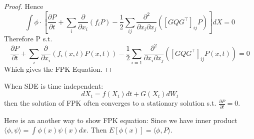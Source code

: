 \begin{proof}
    Hence $$\int \phi \cdot\left[\frac{\partial P}{\partial t}+\sum_{i} \frac{\partial}{\partial x_{i}}\left(f_{i} P\right)-\frac{1}{2} \sum_{i j} \frac{\partial^{2}}{\partial x_{i} \partial x_{j}}\left(\left[G Q G^{\top}\right]_{i j} P\right)\right] d X=0$$
    Therefore P s.t.    
    \begin{equation}
        \frac{\partial P}{\partial t}+\sum_{i} \frac{\partial}{\partial x_{i}}\left(f_{i}(x, t) P(x, t)\right)-\frac{1}{2} \sum_{i=1} \frac{\partial^{2}}{\partial x_{i} \partial x_{j}}\left(\left[G Q G^{\top}\right]_{i j} P\left(x,t\right)\right)=0
    \end{equation}
    Which gives the FPK Equation.
\end{proof}

\begin{remark}
    When SDE is time independent:  
    \begin{equation}
        d X_t=f(X_t) d t+G(X_t) d W_{t}  
    \end{equation}
    then the solution of FPK often converges to a stationary solution s.t.  $\frac{\partial P}{\partial t}=0$.
\end{remark}
Here is an another way to show FPK equation: Since we have inner product $\langle\phi, \psi\rangle=\int \phi(x)\psi(x)dx$. Then $E[\phi(x)]=\langle\phi, P\rangle$.

